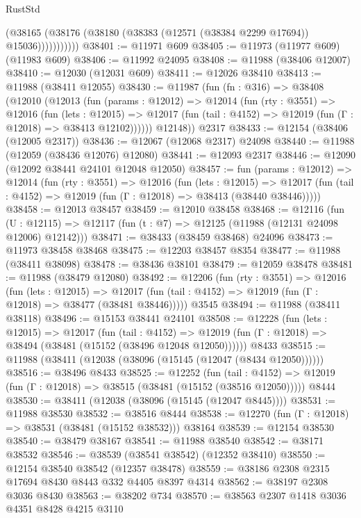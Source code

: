 \begin{lexlean}{RustStd}
\begin{coremodule}
                  (@38165 (@38176 (@38180 (@38383 (@12571 (@38384 @2299 @17694)) @15036)))))))))))
@38401 := @11971 @609
@38405 := @11973 (@11977 @609) (@11983 @609)
@38406 := @11992 @24095
@38408 := @11988 (@38406 @12007)
@38410 := @12030 (@12031 @609)
@38411 := @12026 @38410
@38413 := @11988 (@38411 @12055)
@38430 := @11987
    (fun (fn : @316) =>
    @38408
      (@12010
        (@12013
          (fun (params : @12012) =>
          @12014
            (fun (rty : @3551) =>
            @12016
              (fun (lets : @12015) =>
              @12017 (fun (tail : @4152) => @12019 (fun (Γ : @12018) => @38413 @12102))))))
        @12148))
    @2317
@38433 := @12154 (@38406 (@12005 @2317))
@38436 := @12067 (@12068 @2317) @24098
@38440 := @11988 (@12059 (@38436 @12076) @12080)
@38441 := @12093 @2317
@38446 := @12090 (@12092 @38441 @24101 @12048 @12050)
@38457 := fun (params : @12012) =>
  @12014
    (fun (rty : @3551) =>
    @12016
      (fun (lets : @12015) =>
      @12017 (fun (tail : @4152) => @12019 (fun (Γ : @12018) => @38413 (@38440 @38446)))))
@38458 := @12013 @38457
@38459 := @12010 @38458
@38468 := @12116
    (fun (U : @12115) => @12117 (fun (t : @7) => @12125 (@11988 (@12131 @24098 @12006) @12142)))
@38471 := @38433 (@38459 @38468) @24096
@38473 := @11973 @38458 @38468
@38475 := @12203 @38457 @8354
@38477 := @11988 (@38411 @38098)
@38478 := @38436 @38101
@38479 := @12059 @38478
@38481 := @11988 (@38479 @12080)
@38492 := @12206
    (fun (rty : @3551) =>
    @12016
      (fun (lets : @12015) =>
      @12017 (fun (tail : @4152) => @12019 (fun (Γ : @12018) => @38477 (@38481 @38446)))))
    @3545
@38494 := @11988 (@38411 @38118)
@38496 := @15153 @38441 @24101
@38508 := @12228
    (fun (lets : @12015) =>
    @12017
      (fun (tail : @4152) =>
      @12019 (fun (Γ : @12018) => @38494 (@38481 (@15152 (@38496 @12048 @12050))))))
    @8433
@38515 := @11988 (@38411 (@12038 (@38096 (@15145 (@12047 (@8434 @12050))))))
@38516 := @38496 @8433
@38525 := @12252
    (fun (tail : @4152) => @12019 (fun (Γ : @12018) => @38515 (@38481 (@15152 (@38516 @12050)))))
    @8444
@38530 := @38411 (@12038 (@38096 (@15145 (@12047 @8445))))
@38531 := @11988 @38530
@38532 := @38516 @8444
@38538 := @12270 (fun (Γ : @12018) => @38531 (@38481 (@15152 @38532))) @38164
@38539 := @12154 @38530
@38540 := @38479 @38167
@38541 := @11988 @38540
@38542 := @38171 @38532
@38546 := @38539 (@38541 @38542) (@12352 @38410)
@38550 := @12154 @38540 @38542 (@12357 @38478)
@38559 := @38186 @2308 @2315 @17694 @8430 @8443 @332 @4405 @8397 @4314
@38562 := @38197 @2308 @3036 @8430
@38563 := @38202 @734
@38570 := @38563 @2307 @1418 @3036 @4351 @8428 @4215 @3110

\end{coremodule}
\end{lexlean}
